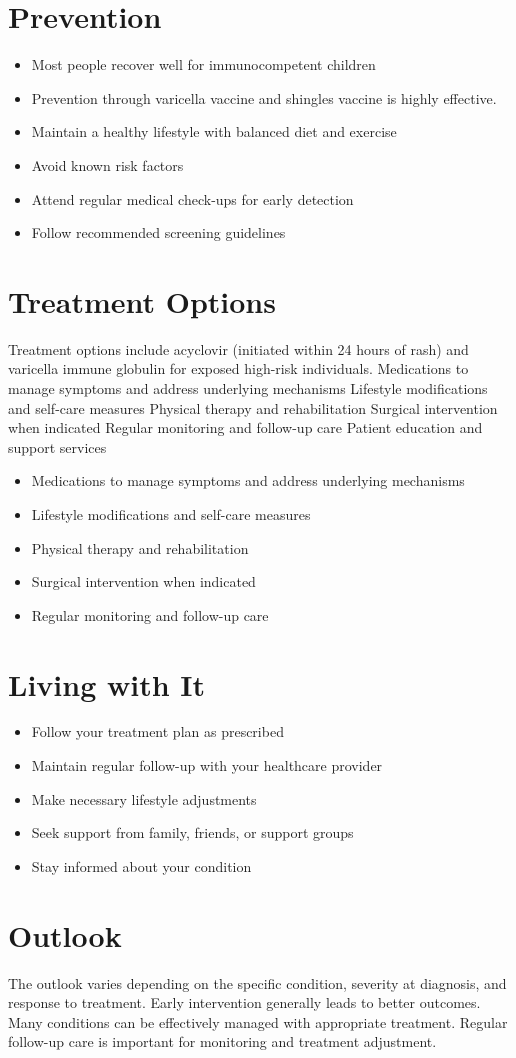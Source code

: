 \section{Prevention}
\begin{itemize}[noitemsep]
  \item Most people recover well for immunocompetent children
  \item Prevention through varicella vaccine and shingles vaccine is highly effective.
  \item Maintain a healthy lifestyle with balanced diet and exercise
  \item Avoid known risk factors
  \item Attend regular medical check-ups for early detection
  \item Follow recommended screening guidelines
\end{itemize}
\section{Treatment Options}
Treatment options include acyclovir (initiated within 24 hours of rash) and varicella immune globulin for exposed high-risk individuals. Medications to manage symptoms and address underlying mechanisms Lifestyle modifications and self-care measures Physical therapy and rehabilitation Surgical intervention when indicated Regular monitoring and follow-up care Patient education and support services

\begin{itemize}[noitemsep]
  \item Medications to manage symptoms and address underlying mechanisms
  \item Lifestyle modifications and self-care measures
  \item Physical therapy and rehabilitation
  \item Surgical intervention when indicated
  \item Regular monitoring and follow-up care
\end{itemize}
\section{Living with It}
\begin{itemize}[noitemsep]
  \item Follow your treatment plan as prescribed
  \item Maintain regular follow-up with your healthcare provider
  \item Make necessary lifestyle adjustments
  \item Seek support from family, friends, or support groups
  \item Stay informed about your condition
\end{itemize}
\section{Outlook}
The outlook varies depending on the specific condition, severity at diagnosis, and response to treatment. Early intervention generally leads to better outcomes. Many conditions can be effectively managed with appropriate treatment. Regular follow-up care is important for monitoring and treatment adjustment.
